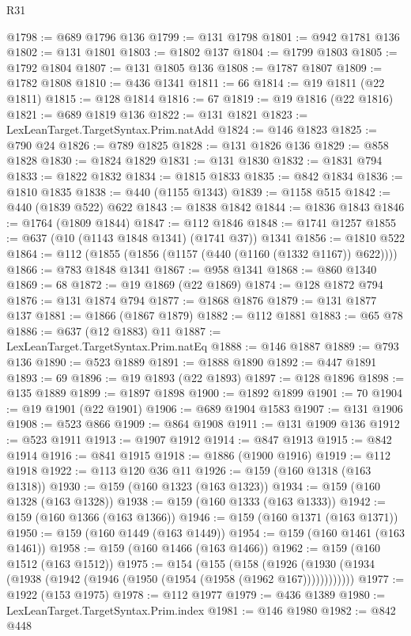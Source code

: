 \begin{lexlean}{R31}
\begin{coremodule}
@1798 := @689 @1796 @136
@1799 := @131 @1798
@1801 := @942 @1781 @136
@1802 := @131 @1801
@1803 := @1802 @137
@1804 := @1799 @1803
@1805 := @1792 @1804
@1807 := @131 @1805 @136
@1808 := @1787 @1807
@1809 := @1782 @1808
@1810 := @436 @1341
@1811 := 66
@1814 := @19 @1811 (@22 @1811)
@1815 := @128 @1814
@1816 := 67
@1819 := @19 @1816 (@22 @1816)
@1821 := @689 @1819 @136
@1822 := @131 @1821
@1823 := LexLeanTarget.TargetSyntax.Prim.natAdd
@1824 := @146 @1823
@1825 := @790 @24
@1826 := @789 @1825
@1828 := @131 @1826 @136
@1829 := @858 @1828
@1830 := @1824 @1829
@1831 := @131 @1830
@1832 := @1831 @794
@1833 := @1822 @1832
@1834 := @1815 @1833
@1835 := @842 @1834
@1836 := @1810 @1835
@1838 := @440 (@1155 @1343)
@1839 := @1158 @515
@1842 := @440 (@1839 @522) @622
@1843 := @1838 @1842
@1844 := @1836 @1843
@1846 := @1764 (@1809 @1844)
@1847 := @112 @1846
@1848 := @1741 @1257
@1855 := @637 (@10 (@1143 @1848 @1341) (@1741 @37)) @1341
@1856 := @1810 @522
@1864 := @112 (@1855 (@1856 (@1157 (@440 (@1160 (@1332 @1167)) @622))))
@1866 := @783 @1848 @1341
@1867 := @958 @1341
@1868 := @860 @1340
@1869 := 68
@1872 := @19 @1869 (@22 @1869)
@1874 := @128 @1872 @794
@1876 := @131 @1874 @794
@1877 := @1868 @1876
@1879 := @131 @1877 @137
@1881 := @1866 (@1867 @1879)
@1882 := @112 @1881
@1883 := @65 @78
@1886 := @637 (@12 @1883) @11
@1887 := LexLeanTarget.TargetSyntax.Prim.natEq
@1888 := @146 @1887
@1889 := @793 @136
@1890 := @523 @1889
@1891 := @1888 @1890
@1892 := @447 @1891
@1893 := 69
@1896 := @19 @1893 (@22 @1893)
@1897 := @128 @1896
@1898 := @135 @1889
@1899 := @1897 @1898
@1900 := @1892 @1899
@1901 := 70
@1904 := @19 @1901 (@22 @1901)
@1906 := @689 @1904 @1583
@1907 := @131 @1906
@1908 := @523 @866
@1909 := @864 @1908
@1911 := @131 @1909 @136
@1912 := @523 @1911
@1913 := @1907 @1912
@1914 := @847 @1913
@1915 := @842 @1914
@1916 := @841 @1915
@1918 := @1886 (@1900 @1916)
@1919 := @112 @1918
@1922 := @113 @120 @36 @11
@1926 := @159 (@160 @1318 (@163 @1318))
@1930 := @159 (@160 @1323 (@163 @1323))
@1934 := @159 (@160 @1328 (@163 @1328))
@1938 := @159 (@160 @1333 (@163 @1333))
@1942 := @159 (@160 @1366 (@163 @1366))
@1946 := @159 (@160 @1371 (@163 @1371))
@1950 := @159 (@160 @1449 (@163 @1449))
@1954 := @159 (@160 @1461 (@163 @1461))
@1958 := @159 (@160 @1466 (@163 @1466))
@1962 := @159 (@160 @1512 (@163 @1512))
@1975 := @154
    (@155
      (@158 (@1926 (@1930 (@1934 (@1938 (@1942 (@1946 (@1950 (@1954 (@1958 (@1962 @167))))))))))))
@1977 := @1922 (@153 @1975)
@1978 := @112 @1977
@1979 := @436 @1389
@1980 := LexLeanTarget.TargetSyntax.Prim.index
@1981 := @146 @1980
@1982 := @842 @448

\end{coremodule}
\end{lexlean}
